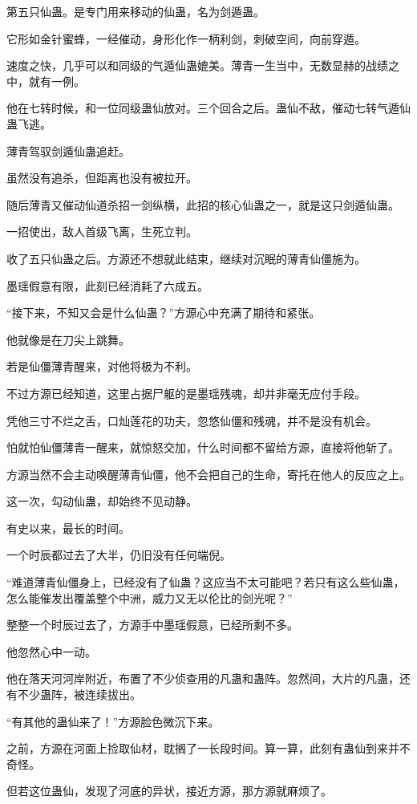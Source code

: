 \begin{this_body}
第五只仙蛊。是专门用来移动的仙蛊，名为剑遁蛊。

它形如金针蜜蜂，一经催动，身形化作一柄利剑，刺破空间，向前穿遁。

速度之快，几乎可以和同级的气遁仙蛊媲美。薄青一生当中，无数显赫的战绩之中，就有一例。

他在七转时候，和一位同级蛊仙放对。三个回合之后。蛊仙不敌，催动七转气遁仙蛊飞逃。

薄青驾驭剑遁仙蛊追赶。

虽然没有追杀，但距离也没有被拉开。

随后薄青又催动仙道杀招一剑纵横，此招的核心仙蛊之一，就是这只剑遁仙蛊。

一招使出，敌人首级飞离，生死立判。

收了五只仙蛊之后。方源还不想就此结束，继续对沉眠的薄青仙僵施为。

墨瑶假意有限，此刻已经消耗了六成五。

“接下来，不知又会是什么仙蛊？”方源心中充满了期待和紧张。

他就像是在刀尖上跳舞。

若是仙僵薄青醒来，对他将极为不利。

不过方源已经知道，这里占据尸躯的是墨瑶残魂，却并非毫无应付手段。

凭他三寸不烂之舌，口灿莲花的功夫，忽悠仙僵和残魂，并不是没有机会。

怕就怕仙僵薄青一醒来，就惊怒交加，什么时间都不留给方源，直接将他斩了。

方源当然不会主动唤醒薄青仙僵，他不会把自己的生命，寄托在他人的反应之上。

这一次，勾动仙蛊，却始终不见动静。

有史以来，最长的时间。

一个时辰都过去了大半，仍旧没有任何端倪。

“难道薄青仙僵身上，已经没有了仙蛊？这应当不太可能吧？若只有这么些仙蛊，怎么能催发出覆盖整个中洲，威力又无以伦比的剑光呢？”

整整一个时辰过去了，方源手中墨瑶假意，已经所剩不多。

他忽然心中一动。

他在落天河河岸附近，布置了不少侦查用的凡蛊和蛊阵。忽然间，大片的凡蛊，还有不少蛊阵，被连续拔出。

“有其他的蛊仙来了！”方源脸色微沉下来。

之前，方源在河面上捡取仙材，耽搁了一长段时间。算一算，此刻有蛊仙到来并不奇怪。

但若这位蛊仙，发现了河底的异状，接近方源，那方源就麻烦了。


\end{this_body}

